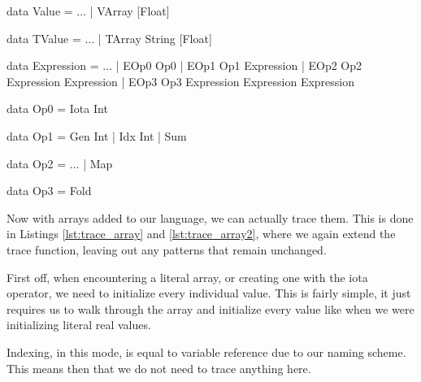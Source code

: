         \begin{haskell}[caption=Adding arrays, label=lst:language_array, gobble=12]
            data Value = $\ldots$ | VArray [Float]
                
            data TValue = $\ldots$ | TArray String [Float]

            data Expression
                = $\ldots$
                | EOp0 Op0
                | EOp1 Op1 Expression
                | EOp2 Op2 Expression Expression
                | EOp3 Op3 Expression Expression Expression

            data Op0 = Iota Int
            
            data Op1 = Gen Int | Idx Int | Sum

            data Op2 = $\ldots$ | Map

            data Op3 = Fold
        \end{haskell}

        Now with arrays added to our language, we can actually trace them.
        This is done in Listings \ref{lst:trace_array} and \ref{lst:trace_array2}, where we again extend the trace function, leaving out any patterns that remain unchanged.
        
        First off, when encountering a literal array, or creating one with the iota operator, we need to initialize every individual value.
        This is fairly simple, it just requires us to walk through the array and initialize every value like when we were initializing literal real values.

        Indexing, in this mode, is equal to variable reference due to our naming scheme.
        This means then that we do not need to trace anything here.


